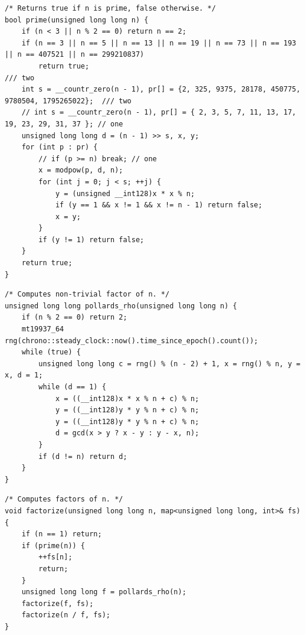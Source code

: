 \documentclass[a4paper,10pt]{article}
\newenvironment{keepfunction}{\begin{samepage}}{\end{samepage}}
\begin{document}
\begin{keepfunction}
\begin{verbatim}
/* Returns true if n is prime, false otherwise. */
bool prime(unsigned long long n) {
    if (n < 3 || n % 2 == 0) return n == 2;
    if (n == 3 || n == 5 || n == 13 || n == 19 || n == 73 || n == 193 || n == 407521 || n == 299210837)
        return true;                                                                          /// two
    int s = __countr_zero(n - 1), pr[] = {2, 325, 9375, 28178, 450775, 9780504, 1795265022};  /// two
    // int s = __countr_zero(n - 1), pr[] = { 2, 3, 5, 7, 11, 13, 17, 19, 23, 29, 31, 37 }; // one
    unsigned long long d = (n - 1) >> s, x, y;
    for (int p : pr) {
        // if (p >= n) break; // one
        x = modpow(p, d, n);
        for (int j = 0; j < s; ++j) {
            y = (unsigned __int128)x * x % n;
            if (y == 1 && x != 1 && x != n - 1) return false;
            x = y;
        }
        if (y != 1) return false;
    }
    return true;
}
\end{verbatim}
\end{keepfunction}

\begin{keepfunction}
\begin{verbatim}
/* Computes non-trivial factor of n. */
unsigned long long pollards_rho(unsigned long long n) {
    if (n % 2 == 0) return 2;
    mt19937_64 rng(chrono::steady_clock::now().time_since_epoch().count());
    while (true) {
        unsigned long long c = rng() % (n - 2) + 1, x = rng() % n, y = x, d = 1;
        while (d == 1) {
            x = ((__int128)x * x % n + c) % n;
            y = ((__int128)y * y % n + c) % n;
            y = ((__int128)y * y % n + c) % n;
            d = gcd(x > y ? x - y : y - x, n);
        }
        if (d != n) return d;
    }
}
\end{verbatim}
\end{keepfunction}

\begin{keepfunction}
\begin{verbatim}
/* Computes factors of n. */
void factorize(unsigned long long n, map<unsigned long long, int>& fs) {
    if (n == 1) return;
    if (prime(n)) {
        ++fs[n];
        return;
    }
    unsigned long long f = pollards_rho(n);
    factorize(f, fs);
    factorize(n / f, fs);
}
\end{verbatim}
\end{keepfunction}
\end{document}
